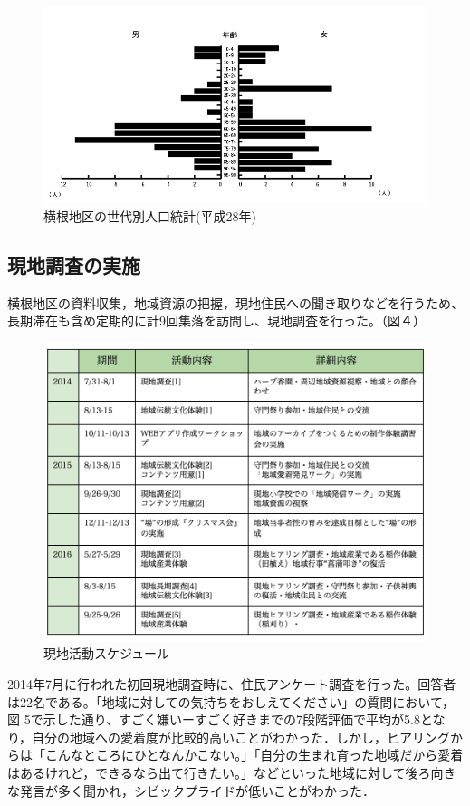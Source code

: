 \documentclass[a4paper]{jsarticle}
\begin{document}
\begin{figure}[H]
  \begin{center}
    \includegraphics[width=1.0\hsize]{./images/zinnkou.jpg}
    \caption{横根地区の世代別人口統計(平成28年)}
    \label{fig:tmu_hino}
  \end{center}
\end{figure}

\subsection{現地調査の実施}
横根地区の資料収集，地域資源の把握，現地住民への聞き取りなどを行うため、長期滞在も含め定期的に計9回集落を訪問し、現地調査を行った。（図４）

\begin{figure}[H]
  \begin{center}
    \includegraphics[width=1.0\hsize]{./images/18.png}
    \caption{現地活動スケジュール}
    \label{fig:tmu_hino}
  \end{center}
\end{figure}
2014年7月に行われた初回現地調査時に、住民アンケート調査を行った。回答者は22名である。「地域に対しての気持ちをおしえてください」の質問において，図
5で示した通り、すごく嫌いーすごく好きまでの7段階評価で平均が5.8となり，自分の地域への愛着度が比較的高いことがわかった．しかし，ヒアリングからは「こんなところにひとなんかこない。」「自分の生まれ育った地域だから愛着はあるけれど，できるなら出て行きたい。」などといった地域に対して後ろ向きな発言が多く聞かれ，シビックプライドが低いことがわかった．
\end{document}

